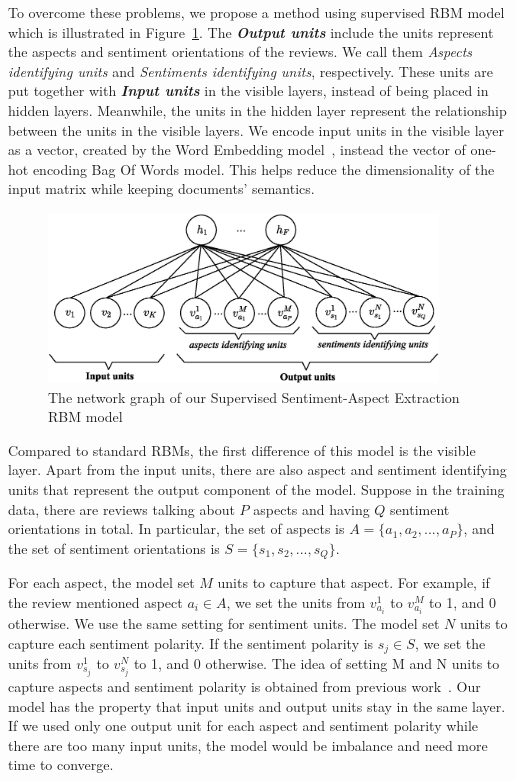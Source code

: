 To overcome these problems, we propose a method using supervised RBM model which is illustrated in Figure~\ref{fig:rbm2}.
The \textbf{\textit{Output units}} include the units represent the aspects and sentiment orientations of the reviews.
We call them \textit{Aspects identifying units} and \textit{Sentiments identifying units}, respectively.
These units are put together with \textbf{\textit{Input units}} in the visible layers, instead of being placed in hidden layers.
Meanwhile, the units in the hidden layer represent the relationship between the units in the visible layers.
We encode input units in the visible layer as a vector, created by the Word Embedding model~\cite{rehurek_lrec_word2vec}, instead the vector of one-hot encoding Bag Of Words model.
This helps reduce the dimensionality of the input matrix while keeping documents' semantics.

\begin{figure}
	\centering
	\includegraphics[height=4.5cm]{SupervisedRBM}
	\caption{The network graph of our Supervised Sentiment-Aspect Extraction RBM model}
	\label{fig:rbm2}
\end{figure}

Compared to standard RBMs, the first difference of this model is the visible layer.
Apart from the input units, there are also aspect and sentiment identifying units that represent the output component of the model.
Suppose in the training data, there are reviews talking about $P$ aspects and having $Q$ sentiment orientations in total.
In particular, the set of aspects is $ A = \{a_1, a_2, ..., a_P\}$, and the set of sentiment orientations is $ S = \{s_1, s_2, ..., s_Q\}$.

For each aspect, the model set $M$ units to capture that aspect.
For example, if the review mentioned aspect $a_i \in A$, we set the units from $v^1_{a_i}$ to $v^M_{a_i}$ to 1, and 0 otherwise.
We use the same setting for sentiment units.
The model set $N$ units to capture each sentiment polarity.
If the sentiment polarity is $s_j \in S$, we set the units from $v^1_{s_j}$ to $v^N_{s_j}$ to 1, and 0 otherwise.
The idea of setting M and N units to capture aspects and sentiment polarity is obtained from previous work~\cite{Fischer2012}.
Our model has the property that input units and output units stay in the same layer.
If we used only one output unit for each aspect and sentiment polarity while there are too many input units, the model would be imbalance and need more time to converge. 

